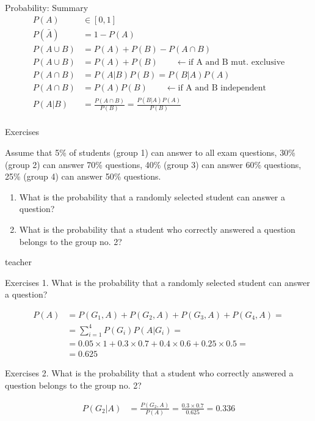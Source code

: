 \begin{frame}{Probability: Summary}
    \begin{align*}
    P(A) & \in [0, 1] \\
    P(\bar{A}) &= 1 - P(A) \\[3ex]
    P(A \cup B) &= P(A) + P(B) - P(A \cap B) \\
    P(A \cup B) &= P(A) + P(B) \qquad \leftarrow \text{if A and B mut. exclusive} \\[3ex]
    P(A \cap B) &= P(A|B)P(B) = P(B|A)P(A) \\
    P(A \cap B) &= P(A)P(B) \qquad \leftarrow \text{if A and B independent} \\[3ex]
    P(A|B) &= \frac{P(A \cap B)}{P(B)} = \frac{P(B|A)P(A)}{P(B)} \\
    \end{align*}
\end{frame}

\begin{frame}{Exercises}
    \begin{example}
        \medskip
        Assume that 5\% of students (group 1) can answer to all exam questions, 30\% (group 2) can answer 70\% questions, 40\% (group 3) can answer 60\% questions, 25\% (group 4) can answer 50\% questions.
        \begin{enumerate}
            \item What is the probability that a randomly selected student can answer a question?
            \item What is the probability that a student who correctly answered a question belongs to the group no. 2?
        \end{enumerate}
    \end{example}
\end{frame}

\begin{shownto}{teacher}
    \begin{frame}{Exercises}
        1. What is the probability that a randomly selected student can answer a question?
        \medskip
        
        \begin{align*}
        P(A)    &= P(G_1, A) + P(G_2, A) + P(G_3, A) + P(G_4, A) =\\
                &= \sum_{i=1}^{4}P(G_i)P(A|G_i) =\\
                &= 0.05 \times 1 + 0.3 \times 0.7 + 0.4 \times 0.6 + 0.25 \times 0.5 =\\
                &= 0.625
        \end{align*}
    \end{frame}
    
    \begin{frame}{Exercises}
        2. What is the probability that a student who correctly answered a question belongs to the group no. 2?
        \medskip
        
        \begin{align*}
        P(G_2|A)    &= \frac{P(G_2, A)}{P(A)} = \frac{0.3 \times 0.7}{0.625} = 0.336
        \end{align*}
    \end{frame}
\end{shownto}

